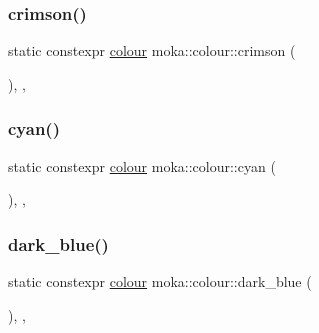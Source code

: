 \subsubsection{\texorpdfstring{crimson()}{crimson()}}
{\footnotesize\ttfamily static constexpr \mbox{\hyperlink{classmoka_1_1colour}{colour}} moka\+::colour\+::crimson (\begin{DoxyParamCaption}{ }\end{DoxyParamCaption})\hspace{0.3cm}{\ttfamily [inline]}, {\ttfamily [static]}, {\ttfamily [noexcept]}}

\mbox{\label{classmoka_1_1colour_ac079b7ba0870353c46fe83e2f17f9794}} 
\subsubsection{\texorpdfstring{cyan()}{cyan()}}
{\footnotesize\ttfamily static constexpr \mbox{\hyperlink{classmoka_1_1colour}{colour}} moka\+::colour\+::cyan (\begin{DoxyParamCaption}{ }\end{DoxyParamCaption})\hspace{0.3cm}{\ttfamily [inline]}, {\ttfamily [static]}, {\ttfamily [noexcept]}}

\mbox{\label{classmoka_1_1colour_a4d323bb1bbdd9fa105f0cb5d02b9461f}} 
\subsubsection{\texorpdfstring{dark\_blue()}{dark\_blue()}}
{\footnotesize\ttfamily static constexpr \mbox{\hyperlink{classmoka_1_1colour}{colour}} moka\+::colour\+::dark\+\_\+blue (\begin{DoxyParamCaption}{ }\end{DoxyParamCaption})\hspace{0.3cm}{\ttfamily [inline]}, {\ttfamily [static]}, {\ttfamily [noexcept]}}

\mbox{\label{classmoka_1_1colour_a741a01928dbbfedbcb07a48be38e3ff5}} 
